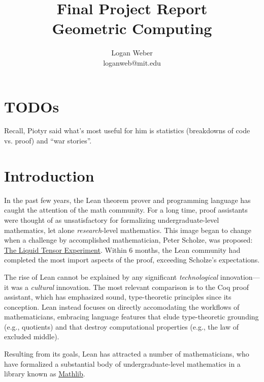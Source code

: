 \documentclass{article}
\begin{document}
\title{%
  Final Project Report
  \\[0.5em]
  \large Geometric Computing \\
}

\author{
Logan Weber\\
loganweb@mit.edu
}

\def\aSigma{\overline{\Sigma}}
\def\asigma{\overline{\sigma}}
\def\aheap{\overline{h}}

\date{}

\maketitle

\section{TODOs}
Recall, Piotyr said what's most useful for him is statistics (breakdowns of code vs. proof) and ``war stories''.

\section{Introduction}
In the past few years, the Lean theorem prover and programming language has caught the attention of the math community.
For a long time, proof assistants were thought of as unsatisfactory for formalizing undergraduate-level mathematics, let alone \textit{research}-level mathematics.
This image began to change when a challenge by accomplished mathematician, Peter Scholze, was proposed: \href{https://xenaproject.wordpress.com/2020/12/05/liquid-tensor-experiment/}{The Liquid Tensor Experiment}.
Within 6 months, the Lean community had completed the most import aspects of the proof, exceeding Scholze's expectations.

The rise of Lean cannot be explained by any significant \textit{technological} innovation---it was a \textit{cultural} innovation.
The most relevant comparison is to the Coq proof assistant, which has emphasized sound, type-theoretic principles since its conception.
Lean instead focuses on directly accomodating the workflows of mathematicians, embracing language features that elude type-theoretic grounding (e.g., quotients) and that destroy computational properties (e.g., the law of excluded middle).

Resulting from its goals,
Lean has attracted a number of mathematicians, who have formalized a substantial body of undergraduate-level mathematics in a library known as \href{https://leanprover-community.github.io}{Mathlib}.
\end{document}
